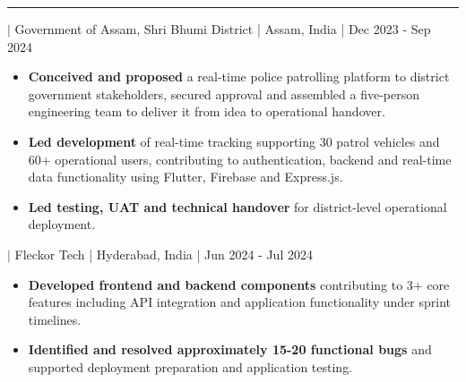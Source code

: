 \documentclass[a4paper]{article}
\newcommand{\cvsection}[1]{\par\vspace{7.0pt}{\fontsize{11}{11}\selectfont\bfseries\MakeUppercase{#1}}\par\vspace{1pt}\hrule\vspace{2.5pt}}
\newcommand{\entry}[2]{{\bfseries #1} $|$ #2\par}
\begin{document}
\cvsection{Work Experience}\entry{Founder \& Technical Lead --- Police Night Patrolling System}{Government of Assam, Shri Bhumi District | Assam, India | Dec 2023 - Sep 2024}\begin{itemize}\item \textbf{Conceived and proposed} a real-time police patrolling platform to district government stakeholders, secured approval and assembled a five-person engineering team to deliver it from idea to operational handover.\item \textbf{Led development} of real-time tracking supporting 30 patrol vehicles and 60+ operational users, contributing to authentication, backend and real-time data functionality using Flutter, Firebase and Express.js.\item \textbf{Led testing, UAT and technical handover} for district-level operational deployment.\end{itemize}\vspace{2.5pt}\entry{Software Engineering Intern}{Fleckor Tech | Hyderabad, India | Jun 2024 - Jul 2024}\begin{itemize}\item \textbf{Developed frontend and backend components} contributing to 3+ core features including API integration and application functionality under sprint timelines.\item \textbf{Identified and resolved approximately 15-20 functional bugs} and supported deployment preparation and application testing.\end{itemize}
\end{document}
